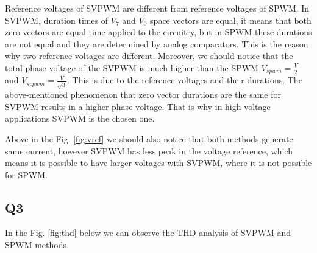 
Reference voltages of SVPWM are different from reference voltages of SPWM. In SVPWM, duration times of $V_7$ and $V_0$ space vectors  are equal, it means that both zero vectors are equal time applied to the circuitry, but in SPWM these durations are not equal and they are determined by analog comparators. This is the reason why two reference voltages are different. Moreover, we should notice that the total phase voltage of the SVPWM is much higher than the SPWM $V_{spwm} = \frac{V}{2} $ and $V_{svpwm} = \frac{V}{\sqrt{3}} $. This is due to the reference voltages and their durations. The above-mentioned phenomenon that zero vector durations are the same for SVPWM results in a higher phase voltage. That is why in high voltage applications SVPWM is the chosen one.

Above in the Fig. \ref{fig:vref} we should also notice that both methods generate same current, however SVPWM has less peak in the voltage reference, which means it is possible to have larger voltages with SVPWM, where it is not possible for SPWM.


\subsection{Q3}

In the Fig. \ref{fig:thd} below we can observe the THD analysis of SVPWM and SPWM methods.

